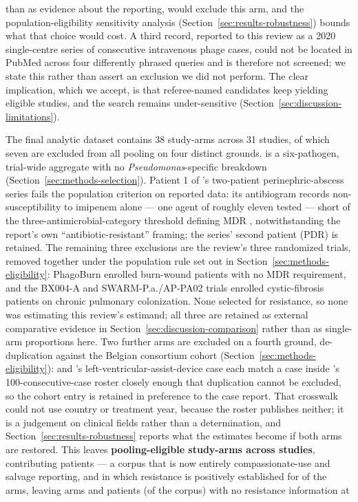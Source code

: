 than as evidence about the reporting, would exclude this arm, and the population-eligibility sensitivity analysis (Section~\ref{sec:results-robustness}) bounds what that choice would cost. A third record, reported to this review as a 2020 single-centre series of consecutive intravenous phage cases, could not be located in PubMed across four differently phrased queries and is therefore not screened; we state this rather than assert an exclusion we did not perform. The clear implication, which we accept, is that referee-named candidates keep yielding eligible studies, and the search remains under-sensitive (Section~\ref{sec:discussion-limitations}).

The final analytic dataset contains 38 study-arms across 31 studies, of which seven are excluded from all pooling on four distinct grounds. \textcite{Leitner2021_lancetid_pyophage} is a six-pathogen, trial-wide aggregate with no \textit{Pseudomonas}-specific breakdown (Section~\ref{sec:methods-selection}). Patient 1 of \citeauthor{Liu2025_mlife_perinephric}'s two-patient perinephric-abscess series fails the population criterion on reported data: its antibiogram records non-susceptibility to imipenem alone --- one agent of roughly eleven tested --- short of the three-antimicrobial-category threshold defining MDR \parencite{Magiorakos2012_mdrxdr}, notwithstanding the report's own ``antibiotic-resistant'' framing; the series' second patient (PDR) is retained. The remaining three exclusions are the review's three randomized trials, removed together under the population rule set out in Section~\ref{sec:methods-eligibility}: PhagoBurn \parencite{Jault2019_phagoburn} enrolled burn-wound patients with no MDR requirement, and the BX004-A \parencite{Weiner2025_natcomms} and SWARM-P.a./AP-PA02 \parencite{Armata_swarmpa} trials enrolled cystic-fibrosis patients on chronic pulmonary colonization. None selected for resistance, so none was estimating this review's estimand; all three are retained as external comparative evidence in Section~\ref{sec:discussion-comparison} rather than as single-arm proportions here. Two further arms are excluded on a fourth ground, de-duplication against the Belgian consortium cohort (Section~\ref{sec:methods-eligibility}): \textcite{Ferry2022_natcomms} and \citeauthor{Racenis2023_viruses}'s left-ventricular-assist-device case each match a case inside \citeauthor{Pirnay2024_natmicrobiol}'s 100-consecutive-case roster closely enough that duplication cannot be excluded, so the cohort entry is retained in preference to the case report. That crosswalk could not use country or treatment year, because the roster publishes neither; it is a judgement on clinical fields rather than a determination, and Section~\ref{sec:results-robustness} reports what the estimates become if both arms are restored. This leaves \textbf{\PrismaPooledArms pooling-eligible study-arms across \PrismaPooledStudies studies}, contributing \PatientsAnalysed patients --- a corpus that is now entirely compassionate-use and salvage reporting, and in which resistance is positively established for \ResClassifiedArms of the \ArmsAnalysed arms, leaving \ResNotClassifiableArms arms and \ResNotClassifiablePatients patients (\ResNotClassifiablePct of the corpus) with no resistance information at 